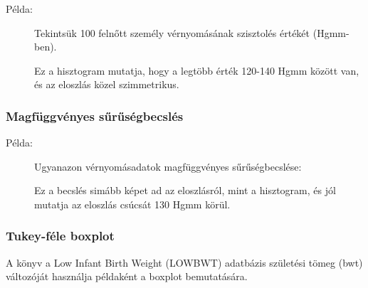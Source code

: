 \documentclass[a4paper,12pt]{article}
\begin{document}
\begin{description}
\item[Példa:] Tekintsük 100 felnőtt személy vérnyomásának szisztolés értékét (Hgmm-ben).

\begin{center}
\end{center}

Ez a hisztogram mutatja, hogy a legtöbb érték 120-140 Hgmm között van, és az eloszlás közel szimmetrikus.
\end{description}

\subsubsection{Magfüggvényes sűrűségbecslés}

\begin{description}
\item[Példa:] Ugyanazon vérnyomásadatok magfüggvényes sűrűségbecslése:

\begin{center}
\end{center}

Ez a becslés simább képet ad az eloszlásról, mint a hisztogram, és jól mutatja az eloszlás csúcsát 130 Hgmm körül.
\end{description}

\subsubsection{Tukey-féle boxplot}

A könyv a Low Infant Birth Weight (LOWBWT) adatbázis születési tömeg (bwt) változóját használja példaként a boxplot bemutatására.
\end{document}

